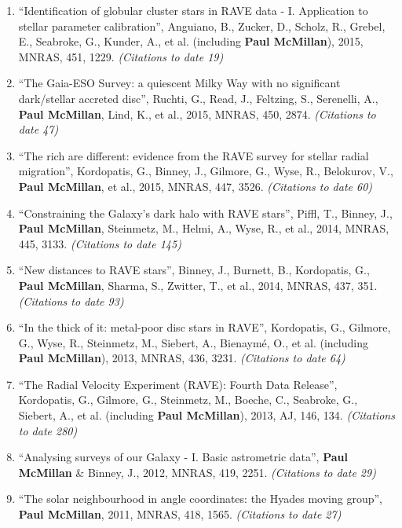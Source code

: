 \documentclass{resume}
\begin{document}
\begin{enumerate}
\item ``Identification of globular cluster stars in RAVE data - I. Application to stellar parameter calibration'', Anguiano, B., Zucker, D., Scholz, R., Grebel, E., Seabroke, G., Kunder, A., et al. (including \textbf{Paul McMillan}), 2015, MNRAS, 451, 1229. \textit{(Citations to date 19)}

\item ``The Gaia-ESO Survey: a quiescent Milky Way with no significant dark/stellar accreted disc'', Ruchti, G., Read, J., Feltzing, S., Serenelli, A., \textbf{Paul McMillan}, Lind, K., et al., 2015, MNRAS, 450, 2874. \textit{(Citations to date 47)}

\item ``The rich are different: evidence from the RAVE survey for stellar radial migration'', Kordopatis, G., Binney, J., Gilmore, G., Wyse, R., Belokurov, V., \textbf{Paul McMillan}, et al., 2015, MNRAS, 447, 3526. \textit{(Citations to date 60)}

\item ``Constraining the Galaxy's dark halo with RAVE stars'', Piffl, T., Binney, J., \textbf{Paul McMillan}, Steinmetz, M., Helmi, A., Wyse, R., et al., 2014, MNRAS, 445, 3133. \textit{(Citations to date 145)}

\item ``New distances to RAVE stars'', Binney, J., Burnett, B., Kordopatis, G., \textbf{Paul McMillan}, Sharma, S., Zwitter, T., et al., 2014, MNRAS, 437, 351. \textit{(Citations to date 93)}

\item ``In the thick of it: metal-poor disc stars in RAVE'', Kordopatis, G., Gilmore, G., Wyse, R., Steinmetz, M., Siebert, A., Bienaym\'e, O., et al. (including \textbf{Paul McMillan}), 2013, MNRAS, 436, 3231. \textit{(Citations to date 64)}

\item ``The Radial Velocity Experiment (RAVE): Fourth Data Release'', Kordopatis, G., Gilmore, G., Steinmetz, M., Boeche, C., Seabroke, G., Siebert, A., et al. (including \textbf{Paul McMillan}), 2013, AJ, 146, 134. \textit{(Citations to date 280)}

\item ``Analysing surveys of our Galaxy - I. Basic astrometric data'', \textbf{Paul McMillan} \& Binney, J., 2012, MNRAS, 419, 2251. \textit{(Citations to date 29)}

\item ``The solar neighbourhood in angle coordinates: the Hyades moving group'', \textbf{Paul McMillan}, 2011, MNRAS, 418, 1565. \textit{(Citations to date 27)}


\end{enumerate}
\end{document}
